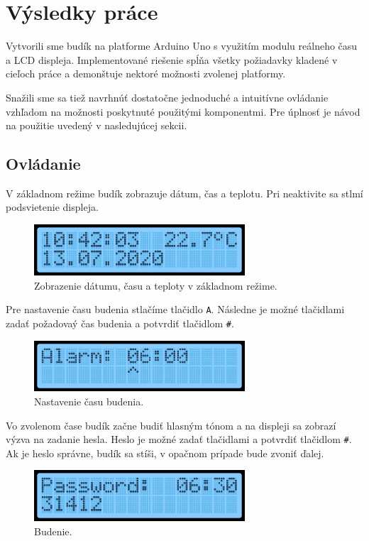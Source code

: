 \chapter{Výsledky práce}
Vytvorili sme budík na platforme Arduino Uno s využitím modulu reálneho času a LCD displeja. Implementované riešenie spĺňa všetky požiadavky kladené v cieľoch práce a demonštuje nektoré možnosti zvolenej platformy.

Snažili sme sa tiež navrhnúť dostatočne jednoduché a intuitívne ovládanie vzhľadom na možnosti poskytnuté použitými komponentmi. Pre úplnosť je návod na použitie uvedený v nasledujúcej sekcii.

\section{Ovládanie}
V základnom režime budík zobrazuje dátum, čas a teplotu. Pri neaktivite sa stlmí podsvietenie displeja.

\begin{figure}[h]
    \centering
    \includegraphics[width=0.7\textwidth]{img/display_time.png}
    \caption{Zobrazenie dátumu, času a teploty v základnom režime.}
\end{figure}

Pre nastavenie času budenia stlačíme tlačidlo \texttt{A}. Následne je možné tlačidlami zadať požadovaý čas budenia a potvrdiť tlačidlom \texttt{\#}.

\begin{figure}[h]
    \centering
    \includegraphics[width=0.7\textwidth]{img/display_set_alarm.png}
    \caption{Nastavenie času budenia.}
\end{figure}

Vo zvolenom čase budík začne budiť hlasným tónom a na displeji sa zobrazí výzva na zadanie hesla. Heslo je možné zadať tlačidlami a potvrdiť tlačidlom \texttt{\#}. Ak je heslo správne, budík sa stíši, v opačnom prípade bude zvoniť ďalej.

\begin{figure}[h]
    \centering
    \includegraphics[width=0.7\textwidth]{img/display_alarm.png}
    \caption{Budenie.}
\end{figure}

